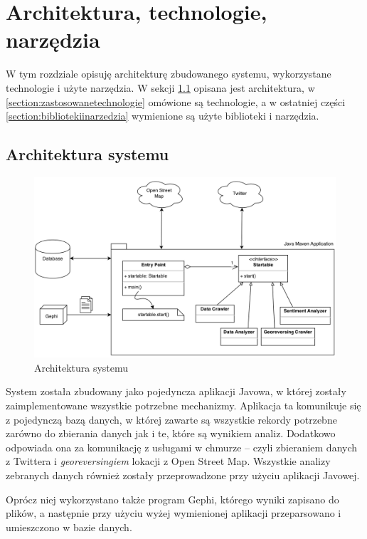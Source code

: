 \chapter{Architektura, technologie, narzędzia}
\label{chapter:architektura}
W tym rozdziale opisuję architekturę zbudowanego systemu, wykorzystane
technologie i użyte narzędzia.
W sekcji \ref{section:architekturasystemu} opisana jest architektura, w
\ref{section:zastosowanetechnologie} omówione są technologie, a w ostatniej
części \ref{section:bibliotekiinarzedzia} wymienione są użyte biblioteki i
narzędzia.
\section{Architektura systemu}
\label{section:architekturasystemu}

\begin{figure}[ht!]
\centering
\includegraphics[width=160mm]{img/architektura.png}
\caption{Architektura systemu}
\label{image:architektura-systemu}
\end{figure}
System została zbudowany jako pojedyncza aplikacji Javowa,
w której zostały zaimplementowane wszystkie potrzebne mechanizmy.
Aplikacja ta komunikuje się z pojedynczą bazą danych, w której zawarte
są wszystkie rekordy potrzebne zarówno do zbierania danych jak i te, które są
wynikiem analiz. Dodatkowo odpowiada ona za komunikację z usługami w chmurze --
czyli zbieraniem danych z Twittera i \textit{georeversingiem} lokacji z Open
Street Map. Wszystkie analizy zebranych danych również zostały przeprowadzone
przy użyciu aplikacji Javowej.

Oprócz niej wykorzystano także program Gephi, którego wyniki zapisano
do plików, a następnie przy użyciu wyżej wymienionej aplikacji przeparsowano i
umieszczono w bazie danych.

